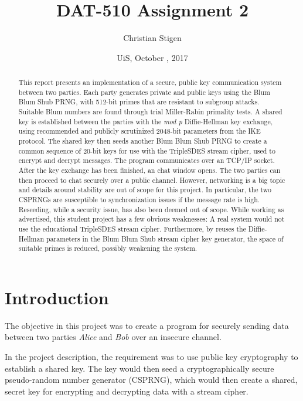 \documentclass[a4paper,english,12pt]{article}
\title{DAT-510 Assignment 2}
\author{Christian Stigen}
\date{UiS, October \nth{9}, 2017}
\begin{document}
\maketitle

\begin{abstract}
  This report presents an implementation of a secure, public key communication
  system between two parties.
  Each party generates private and public keys using the Blum Blum Shub
  PRNG, with 512-bit primes that are resistant to subgroup attacks. Suitable
  Blum numbers are found through trial Miller-Rabin primality tests.
  A shared key is established between the parties with the \textit{mod p}
  Diffie-Hellman key exchange, using recommended and publicly scrutinized
  2048-bit parameters from the IKE protocol.
  The shared key then seeds another Blum Blum Shub PRNG to create a common
  sequence of 20-bit keys for use with the TripleSDES stream cipher, used to
  encrypt and decrypt messages.
  The program communicates over an TCP/IP socket. After the key exchange has
  been finished, an chat window opens. The two parties can then proceed to chat
  securely over a public channel. However, networking is a big topic and
  details around stability are out of scope for this project. In particular,
  the two CSPRNGs are susceptible to synchronization issues if the message rate
  is high. Reseeding, while a security issue, has also been deemed out of
  scope.
  While working as advertised, this student project has a few obvious
  weaknesses: A real system would not use the educational TripleSDES stream
  cipher. Furthermore, by reuses the Diffie-Hellman parameters in the Blum Blum
  Shub stream cipher key generator, the space of suitable primes is reduced,
  possibly weakening the system.
\end{abstract}

\section{Introduction}
The objective in this project was to create a program for securely sending data
between two parties \textit{Alice} and \textit{Bob} over an insecure channel.

In the project description, the requirement was to use public key cryptography
to establish a shared key. The key would then seed a cryptographically secure
pseudo-random number generator (CSPRNG), which would then create a shared,
secret key for encrypting and decrypting data with a stream cipher.
\end{document}
